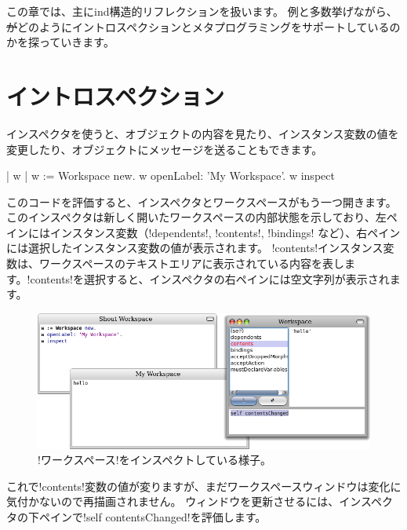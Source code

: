 \documentclass[a4paper,10pt,twoside]{book}
\begin{document}
この章では、主にind{構造的リフレクション}を扱います。
例と多数挙げながら、 \st がどのようにイントロスペクションとメタプログラミングをサポートしているのかを探っていきます。

\section{イントロスペクション}

インスペクタを使うと、オブジェクトの内容を見たり、インスタンス変数の値を変更したり、オブジェクトにメッセージを送ることもできます。

\begin{code}{| w |}
w := Workspace new.
w openLabel: 'My Workspace'.
w inspect
\end{code}

このコードを評価すると、インスペクタとワークスペースがもう一つ開きます。
このインスペクタは新しく開いたワークスペースの内部状態を示しており、左ペインにはインスタンス変数（\ct!dependents!, \ct!contents!, \ct!bindings! など）、右ペインには選択したインスタンス変数の値が表示されます。
\ct!contents!インスタンス変数は、ワークスペースのテキストエリアに表示されている内容を表します。\ct!contents!を選択すると、インスペクタの右ペインには空文字列が表示されます。

\begin{figure}[ht]\centering
	\includegraphics[width=\linewidth]{workspaceInspector}
	\caption{\lct!ワークスペース!をインスペクトしている様子。}
\end{figure}

これで\ct!contents!変数の値が変りますが、まだワークスペースウィンドウは変化に気付かないので再描画されません。
ウィンドウを更新させるには、インスペクタの下ペインで\ct!self contentsChanged!を評価します。
\end{document}
